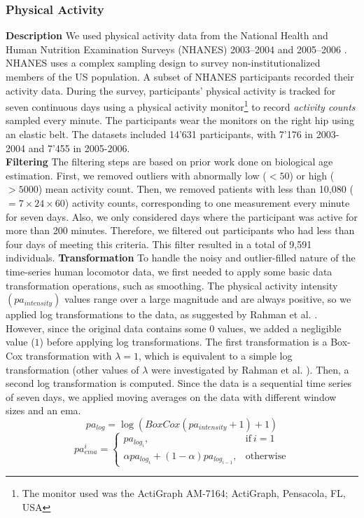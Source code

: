 \subsubsection{Physical Activity}
\textbf{Description} We used physical activity data from the National Health and Human Nutrition Examination Surveys (NHANES) 2003–2004 \cite{cdc_nhanes_2003} and 2005–2006 \cite{cdc_nhanes_2005}. 
NHANES uses a complex sampling design to survey non-institutionalized members of the US population.
A subset of NHANES participants recorded their activity data. During the survey, participants' physical activity is tracked for seven continuous days using a physical activity monitor\footnote{The monitor used was the ActiGraph AM-7164; ActiGraph, Pensacola, FL, USA} to record \textit{activity counts} sampled every minute. 
The participants wear the monitors on the right hip using an elastic belt.
The datasets included 14'631 participants, with 7'176 in 2003-2004 and 7'455 in 2005-2006.\\
\textbf{Filtering} The filtering steps are based on prior work done on biological age estimation\cite{pyrkov_extracting_2018, rahman_deep_2019, shim_wearable-based_2023}. First, we removed outliers with abnormally low ($< 50$) or high ($>5000$) mean activity count. Then, we removed patients with less than 10,080 ($= 7 \times 24 \times 60$) activity counts, corresponding to one measurement every minute for seven days. Also, we only considered days where the participant was active for more than 200 minutes. Therefore, we filtered out participants who had less than four days of meeting this criteria. This filter resulted in a total of 9,591 individuals.
\textbf{Transformation} To handle the noisy and outlier-filled nature of the time-series human locomotor data, we first needed to apply some basic data transformation operations, such as smoothing.
The physical activity intensity $(pa_{intensity})$ values range over a large magnitude and are always positive, so we applied log transformations to the data, as suggested by Rahman et al. \cite{rahman_deep_2019}.
However, since the original data contains some $0$ values, we added a negligible value ($1$) before applying log transformations.
The first transformation is a Box-Cox \cite{box_analysis_1964} transformation with $\lambda = 1$, which is equivalent to a simple log transformation (other values of $\lambda$ were investigated by Rahman et al. \cite{rahman_deep_2019}).
Then, a second log transformation is computed. Since the data is a sequential time series of seven days, we applied moving averages on the data with different window sizes and an \gls{ema}. 
\begin{equation}
    pa_{log} = \log\left(BoxCox\left(pa_{intensity} + 1\right) + 1\right)
\end{equation}
\begin{equation}
    pa_{ema}^i = 
    \begin{cases}
      pa_{log_i}, & \mathrm{if}\ i=1 \\
      \alpha pa_{log_i} + (1 - \alpha) pa_{log_{i-1}}, & \mathrm{otherwise}
    \end{cases}
\end{equation}

